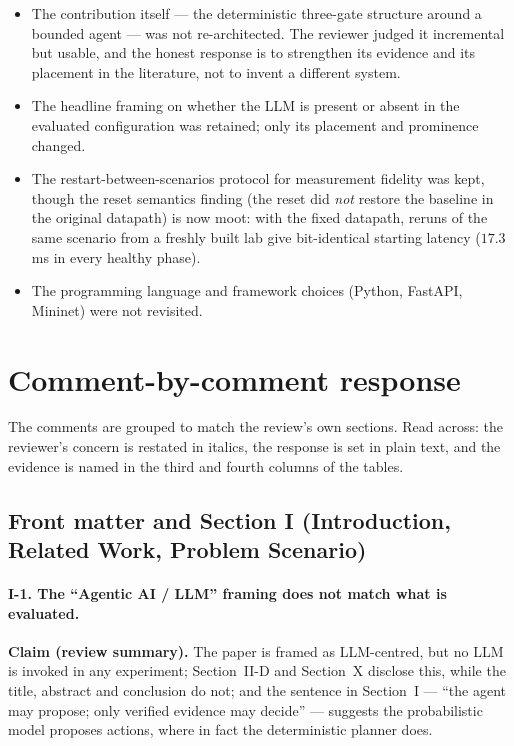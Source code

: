 \documentclass[11pt,a4paper]{article}
\begin{document}
\begin{itemize}
\item The contribution itself --- the deterministic three-gate structure around a
  bounded agent --- was not re-architected. The reviewer judged it incremental
  but usable, and the honest response is to strengthen its evidence and its
  placement in the literature, not to invent a different system.
\item The headline framing on whether the LLM is present or absent in the
  evaluated configuration was retained; only its placement and prominence changed.
\item The restart-between-scenarios protocol for measurement fidelity was kept,
  though the reset semantics finding (the reset did \emph{not} restore the
  baseline in the original datapath) is now moot: with the fixed datapath, reruns
  of the same scenario from a freshly built lab give bit-identical starting
  latency ($17.3$ ms in every healthy phase).
\item The programming language and framework choices (Python, FastAPI, Mininet)
  were not revisited.
\end{itemize}

\section{Comment-by-comment response}

The comments are grouped to match the review's own sections. Read across:
the reviewer's concern is restated in italics, the response is set in plain
text, and the evidence is named in the third and fourth columns of the tables.

\subsection{Front matter and Section I (Introduction, Related Work, Problem Scenario)}

\paragraph{I-1. The ``Agentic AI / LLM'' framing does not match what is evaluated.}

\textbf{Claim (review summary).} The paper is framed as LLM-centred, but no LLM
is invoked in any experiment; Section~II-D and Section~X disclose this, while the
title, abstract and conclusion do not; and the sentence in Section~I ---
``the agent may propose; only verified evidence may decide'' --- suggests the
probabilistic model proposes actions, where in fact the deterministic planner does.
\end{document}
